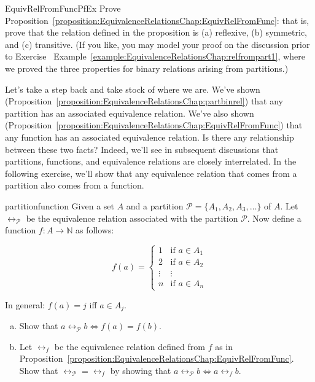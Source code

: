 \begin{exercise}{EquivRelFromFuncPfEx}
Prove Proposition~\ref{proposition:EquivalenceRelationsChap:EquivRelFromFunc}: that is, prove that the relation defined in the proposition is (a) reflexive, (b) symmetric, and (c) transitive.  (If you like, you may model your proof on the discussion prior to Exercise~ Example~\ref{example:EquivalenceRelationsChap:relfrompart1}, where we proved the three properties for binary relations arising from partitions.)

\end{exercise}

Let's take a step back and take stock of where we are. We've shown (Proposition~\ref{proposition:EquivalenceRelationsChap:partbinrel}) that any partition has an associated equivalence relation. We've also shown (Proposition~\ref{proposition:EquivalenceRelationsChap:EquivRelFromFunc}) that any function has an associated equivalence relation. Is there any relationship between these two facts? Indeed, we'll see in subsequent discussions that partitions, functions, and equivalence relations are closely interrelated. In the following exercise, we'll show that any equivalence relation that comes from a partition also comes from a function.

\begin{exercise}{partitionfunction}
Given a set $A$ and a partition $\mathcal{P}=\{A_1, A_2, A_3, \ldots\}$ of $A$.  Let $\rel_\mathcal{P}$ be the equivalence relation associated with the partition $\mathcal{P}$. Now define a function $f:A \rightarrow \mathbb{N}$ as follows:

$$f(a)=
\begin{cases}
1 & \mbox{if $a \in A_1$} \\
2 & \mbox{if $a \in A_2$} \\
\vdots & \vdots \\
n & \mbox{if $a \in A_n$}
\end{cases}$$

In general: $f(a)=j$ iff $a \in A_j$.
\begin{enumerate}[(a)]
\item
Show that $a \rel_\mathcal{P} b \iff f(a)=f(b)$.
\item 
Let $\rel_f$ be the equivalence relation defined from $f$ as in Proposition~\ref{proposition:EquivalenceRelationsChap:EquivRelFromFunc}. 
Show that $\rel_\mathcal{P} = \rel_f$ by showing that $a \rel_\mathcal{P} b \iff a \rel_f b$.
\end{enumerate}
\end{exercise}

